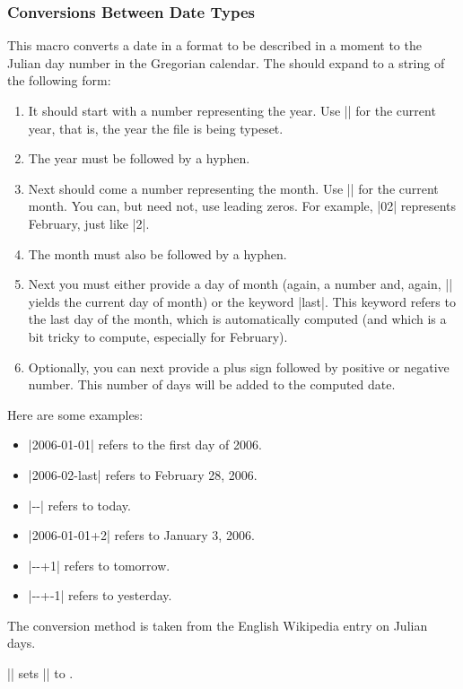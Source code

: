 \subsubsection{Conversions Between Date Types}

\begin{command}{\pgfcalendardatetojulian{}}
  This macro converts a date in a format to be described in a moment
  to the Julian day number in the Gregorian calendar. The 
  should expand to a string of the following form:
  \begin{enumerate}\label{calendar-date-format}
  \item It should start with a number representing the year. Use
    |\year| for the current year, that is, the year the file is being
    typeset.
  \item The year must be followed by a hyphen.
  \item Next should come a number representing the month. Use |\month|
    for the current month. You can, but need not, use leading
    zeros. For example, |02| represents February, just like |2|.
  \item The month must also be followed by a hyphen.
  \item Next you must either provide a day of month (again, a number
    and, again, |\day| yields the current day of month) or the keyword
    |last|. This keyword refers to the last day of the month, which is
    automatically computed (and which is a bit tricky to compute,
    especially for February).
  \item Optionally, you can next provide a plus sign followed by
    positive or negative number. This number of days will be added to
    the computed date.
  \end{enumerate}

  Here are some examples:
  \begin{itemize}
  \item |2006-01-01| refers to the first day of 2006.
  \item |2006-02-last| refers to February 28, 2006.
  \item |\year-\month-\day| refers to today.
  \item |2006-01-01+2| refers to January 3, 2006.
  \item |\year-\month-\day+1| refers to tomorrow.
  \item |\year-\month-\day+-1| refers to yesterday.
  \end{itemize}

  The conversion method is taken from the English Wikipedia entry on
  Julian days.

  \newcount\mycount
  \example || sets
  |\mycount| to
  \the\mycount.


\end{command}

